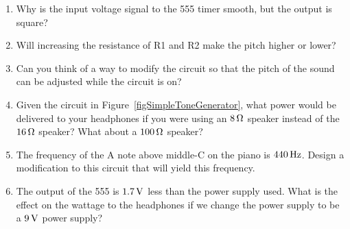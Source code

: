 
\begin{enumerate}
\item Why is the input voltage signal to the 555 timer smooth, but the output is square?
\item Will increasing the resistance of R1 and R2 make the pitch higher or lower?
\item Can you think of a way to modify the circuit so that the pitch of the sound can be adjusted while the circuit is on? 
\item Given the circuit in Figure~\ref{figSimpleToneGenerator}, what power would be delivered to your headphones if you were using an $8\,\si{\ohm}$ speaker instead of the $16\,\si{\ohm}$ speaker?  What about a $100\,\si{\ohm}$ speaker?
\item The frequency of the A note above middle-C on the piano is $440\,\si{\hertz}$.  Design a modification to this circuit that will yield this frequency.
\item The output of the 555 is $1.7\,\si{\volt}$ less than the power supply used.  What is the effect on the wattage to the headphones if we change the power supply to be a $9\,\si{\volt}$ power supply?
\end{enumerate}
